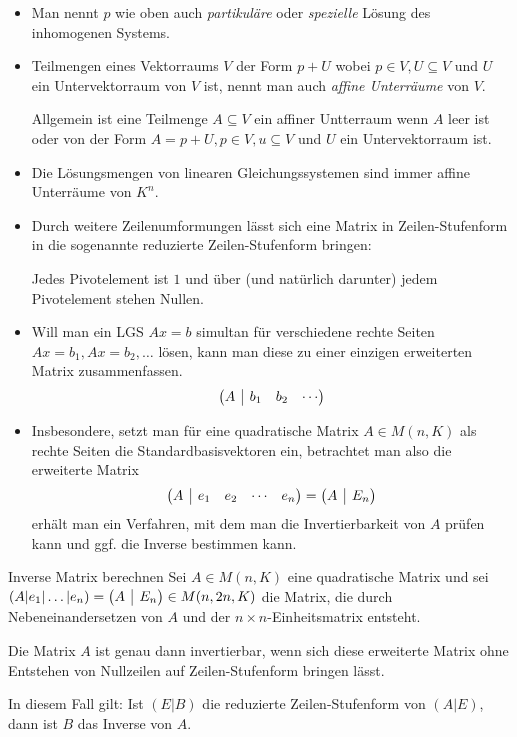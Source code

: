 \bemerkung
\begin{itemize}
	\item Man nennt $p$ wie oben auch \emph{partikuläre} oder \emph{spezielle} Lösung des inhomogenen Systems.
	\item Teilmengen eines Vektorraums $V$ der Form $p+U$ wobei $p\in V, U\subseteq V$ und $U$ ein Untervektorraum von $V$ ist, nennt man auch \emph{affine Unterräume} von $V$.

	Allgemein ist eine Teilmenge $A\subseteq V$ ein affiner Untterraum wenn $A$ leer ist oder von der Form $A=p+U, p\in V, u\subseteq V$ und $U$ ein Untervektorraum ist.
	\item Die Lösungsmengen von linearen Gleichungssystemen sind immer affine Unterräume von $K^n$.
	\item Durch weitere Zeilenumformungen lässt sich eine Matrix in Zeilen-Stufenform in die sogenannte reduzierte Zeilen-Stufenform bringen:

	Jedes Pivotelement ist $1$ und über (und natürlich darunter) jedem Pivotelement stehen Nullen.
	\item Will man ein LGS $Ax=b$ simultan für verschiedene rechte Seiten $Ax=b_1, Ax=b_2, \ldots$ lösen, kann man diese zu einer einzigen erweiterten Matrix zusammenfassen.
	\begin{equation*}
		\ematrix{c|ccc}{A & b_1 & b_2 & \cdots}
	\end{equation*}
	\item Insbesondere, setzt man für eine quadratische Matrix $A\in M(n,K)$ als rechte Seiten die Standardbasisvektoren ein, betrachtet man also die erweiterte Matrix
	\begin{equation*}
		\ematrix{c|cccc}{A & e_1 & e_2 & \cdots & e_n} = \ematrix{c|c}{A & E_n}
	\end{equation*}
	erhält man ein Verfahren, mit dem man die Invertierbarkeit von $A$ prüfen kann und ggf. die Inverse bestimmen kann.
\end{itemize}


\begin{satz}{Inverse Matrix berechnen}
	Sei $A\in M(n,K)$ eine quadratische Matrix und sei $(A|e_1|\ldots|e_n)=\ematrix{c|c}{A & E_n}\in M(n,2n,K)$ die Matrix, die durch Nebeneinandersetzen von $A$ und der $n\times n$-Einheitsmatrix entsteht.

	Die Matrix $A$ ist genau dann invertierbar, wenn sich diese erweiterte Matrix ohne Entstehen von Nullzeilen auf Zeilen-Stufenform bringen lässt.

	In diesem Fall gilt: Ist $(E|B)$ die reduzierte Zeilen-Stufenform von $(A|E)$, dann ist $B$ das Inverse von $A$.
\end{satz}
